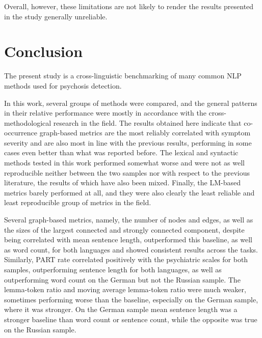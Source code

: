 Overall, however, these limitations are not likely to render the results presented in the study generally unreliable.


\section{Conclusion}
\label{sec:discussion:conclusion}

The present study is a cross-linguistic benchmarking of many common NLP methods used for psychosis detection.


In this work, several groups of methods were compared, and the general patterns in their relative performance were mostly in accordance with the cross-methodological research in the field. The results obtained here indicate that co-occurrence graph-based metrics are the most reliably correlated with symptom severity and are also most in line with the previous results, performing in some cases even better than what was reported before. The lexical and syntactic methods tested in this work performed somewhat worse and were not as well reproducible neither between the two samples nor with respect to the previous literature, the results of which have also been mixed. Finally, the LM-based metrics barely performed at all, and they were also clearly the least reliable and least reproducible group of metrics in the field.

Several graph-based metrics, namely, the number of nodes and edges, as well as the sizes of the largest connected and strongly connected component, despite being correlated with mean sentence length, outperformed this baseline, as well as word count, for both languages and showed consistent results across the tasks. Similarly, PART rate correlated positively with the psychiatric scales for both samples, outperforming sentence length for both languages, as well as outperforming word count on the German but not the Russian sample. The lemma-token ratio and moving average lemma-token ratio were much weaker, sometimes performing worse than the baseline, especially on the German sample, where it was stronger. On the German sample mean sentence length was a stronger baseline than word count or sentence count, while the opposite was true on the Russian sample.

